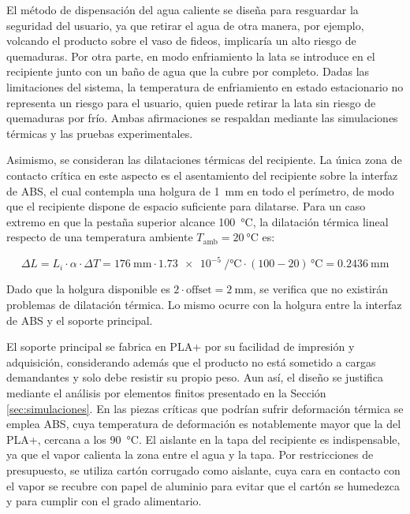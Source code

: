 \documentclass[12pt, a4paper]{article}
\begin{document}
El método de dispensación del agua caliente se diseña para resguardar la seguridad del usuario, ya que retirar el agua de otra manera, por ejemplo, volcando el producto sobre el vaso de fideos, implicaría un alto riesgo de quemaduras. Por otra parte, en modo enfriamiento la lata se introduce en el recipiente junto con un baño de agua que la cubre por completo. Dadas las limitaciones del sistema, la temperatura de enfriamiento en estado estacionario no representa un riesgo para el usuario, quien puede retirar la lata sin riesgo de quemaduras por frío. Ambas afirmaciones se respaldan mediante las simulaciones térmicas y las pruebas experimentales.

Asimismo, se consideran las dilataciones térmicas del recipiente. La única zona de contacto crítica en este aspecto es el asentamiento del recipiente sobre la interfaz de ABS, el cual contempla una holgura de \SI{1}{\mm} en todo el perímetro, de modo que el recipiente dispone de espacio suficiente para dilatarse. Para un caso extremo en que la pestaña superior alcance \SI{100}{\celsius}, la dilatación térmica lineal respecto de una temperatura ambiente $T_{\text{amb}} = \SI{20}{\celsius}$ es:

\begin{equation}
    \Delta L = L_i \cdot \alpha \cdot \Delta T = \SI{176}{\mm} \cdot \SI{1,73e-5}{\per\celsius} \cdot (100 - 20)\,\si{\celsius} = \SI{0,2436}{\mm}
    \label{eq:dilatacion}
\end{equation}

Dado que la holgura disponible es $2 \cdot \text{offset} = \SI{2}{\mm}$, se verifica que no existirán problemas de dilatación térmica. Lo mismo ocurre con la holgura entre la interfaz de ABS y el soporte principal.

El soporte principal se fabrica en PLA+ por su facilidad de impresión y adquisición, considerando además que el producto no está sometido a cargas demandantes y solo debe resistir su propio peso. Aun así, el diseño se justifica mediante el análisis por elementos finitos presentado en la Sección \ref{sec:simulaciones}. En las piezas críticas que podrían sufrir deformación térmica se emplea ABS, cuya temperatura de deformación es notablemente mayor que la del PLA+, cercana a los \SI{90}{\celsius}. El aislante en la tapa del recipiente es indispensable, ya que el vapor calienta la zona entre el agua y la tapa. Por restricciones de presupuesto, se utiliza cartón corrugado como aislante, cuya cara en contacto con el vapor se recubre con papel de aluminio para evitar que el cartón se humedezca y para cumplir con el grado alimentario.
\end{document}
